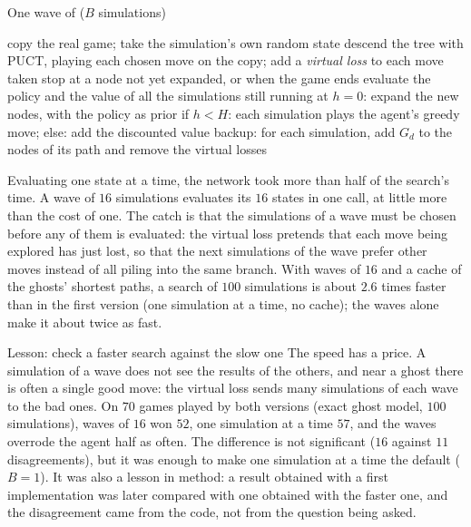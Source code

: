\begin{algobox}{One wave of  ($B$ simulations)}
  \begin{algorithmic}[1]
      \State copy the real game; take the simulation's own random state
      \State descend the tree with PUCT, playing each chosen move on the
        copy; add a \emph{virtual loss} to each move taken
      \State stop at a node not yet expanded, or when the game ends
    \EndFor
     
      \State evaluate the policy and the value of all the simulations still
        running
      \State at $h = 0$: expand the new nodes, with the policy as prior
      \State if $h < H$: each simulation plays the agent's greedy move;
        else: add the discounted value
    \EndFor
    \State backup: for each simulation, add $G_d$ to the nodes of its path
      and remove the virtual losses
  \end{algorithmic}
\end{algobox}

\begin{intuition}
  Evaluating one state at a time, the network took more than half of the
  search's time. A wave of $16$ simulations evaluates its $16$ states in
  one call, at little more than the cost of one. The catch is that the
  simulations of a wave must be chosen before any of them is evaluated: the
  virtual loss pretends that each move being explored has just lost, so
  that the next simulations of the wave prefer other moves instead of all
  piling into the same branch. With waves of $16$ and a cache of the
  ghosts' shortest paths, a search of $100$ simulations is about $2.6$ times
  faster than in the first version (one simulation at a time, no cache);
  the waves alone make it about twice as fast.
\end{intuition}

\begin{remark}{Lesson: check a faster search against the slow one}{}
  The speed has a price. A simulation of a wave does not see the results
  of the others, and near a ghost there is often a single good move: the
  virtual loss sends many simulations of each wave to the bad ones. On $70$
  games played by both versions (exact ghost model, $100$ simulations),
  waves of $16$ won $52$, one simulation at a time $57$, and the waves
  overrode the agent half as often. The difference is not significant ($16$
  against $11$ disagreements), but it was enough to make one simulation at a
  time the default ($B = 1$). It was also a lesson in method: a result
  obtained with a first implementation was later compared with one obtained
  with the faster one, and the disagreement came from the code, not from
  the question being asked.
\end{remark}

